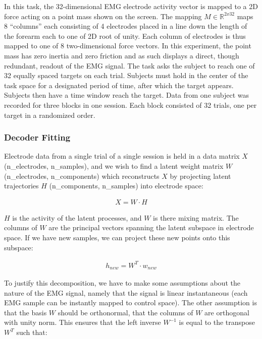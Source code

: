 \documentclass[../main.tex]{subfiles}
\begin{document}
In this task, the 32-dimensional EMG electrode activity vector is mapped to a 2D force acting on a point mass shown on the screen. The mapping $M\in\mathbb{R}^{2x32}$ maps 8 ``columns'' each consisting of 4 electrodes placed in a line down the length of the forearm each to one of 2D root of unity. Each column of electrodes is thus mapped to one of 8 two-dimensional force vectors. In this experiment, the point mass has zero inertia and zero friction and as such displays a direct, though redundant, readout of the EMG signal. The task asks the subject to reach one of 32 equally spaced targets on each trial. Subjects must hold in the center of the task space for a designated period of time, after which the target appears. Subjects then have a time window reach the target. Data from one subject was recorded for three blocks in one session. Each block consisted of 32 trials, one per target in a randomized order.



\subsubsection{Decoder Fitting}

Electrode data from a single trial of a single session is held in a data matrix $X$ (n\_electrodes, n\_samples), and we wish to find a latent weight matrix $W$ (n\_electrodes, n\_components) which reconstructs $X$ by projecting latent trajectories $H$ (n\_components, n\_samples) into electrode space:

\begin{align*}
X = W\cdot{H}
\end{align*}

$H$ is the activity of the latent processes, and $W$ is there mixing matrix. The columns of $W$ are the principal vectors spanning the latent subspace in electrode space. If we have new samples, we can project these new points onto this subspace:

\begin{align*}
h_{new} = W^T\cdot{w_{new}}
\end{align*}

To justify this decomposition, we have to make some assumptions about the nature of the EMG signal, namely that the signal is linear instantaneous (each EMG sample can be instantly mapped to control space). The other assumption is that the basis $W$ should be orthonormal, that the columns of $W$ are orthogonal with unity norm. This ensures that the left inverse $W^{-1}$ is equal to the transpose $W^T$ such that:
\end{document}
